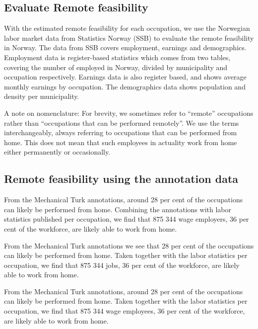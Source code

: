 \documentclass[11pt,]{article}
\begin{document}
\hypertarget{evaluate-remote-feasibility}{%
\subsection{Evaluate Remote
feasibility}\label{evaluate-remote-feasibility}}

With the estimated remote feasibility for each occupation, we use the
Norwegian labor market data from Statistics Norway (SSB) to evaluate the
remote feasibility in Norway. The data from SSB covers employment,
earnings and demographics. Employment data is register-based statistics
which comes from two tables, covering the number of employed in Norway,
divided by municipality and occupation respectively. Earnings data is
also register based, and shows average monthly earnings by occupation.
The demographics data shows population and density per municipality.

A note on nomenclature: For brevity, we sometimes refer to ``remote''
occupations rather than ``occupations that can be performed remotely''.
We use the terms interchangeably, always referring to occupations that
can be performed from home. This does not mean that such employees in
actuality work from home either permanently or occasionally.

\hypertarget{remote-feasibility-using-the-annotation-data}{%
\subsection{Remote feasibility using the annotation
data}\label{remote-feasibility-using-the-annotation-data}}

From the Mechanical Turk annotations, around 28 per cent of the
occupations can likely be performed from home. Combining the annotations
with labor statistics published per occupation, we find that 875 344
wage employers, 36 per cent of the workforce, are likely able to work
from home.

From the Mechanical Turk annotations we see that 28 per cent of the
occupations can likely be performed from home. Taken together with the
labor statistics per occupation, we find that 875 344 jobs, 36 per cent
of the workforce, are likely able to work from home.

From the Mechanical Turk annotations, around 28 per cent of the
occupations can likely be performed from home. Taken together with the
labor statistics per occupation, we find that 875 344 wage employees, 36
per cent of the workforce, are likely able to work from home.
\end{document}
